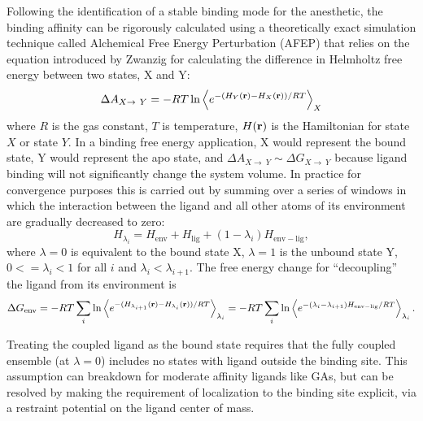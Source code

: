 \documentclass[12pt]{article}
\begin{document}
Following the identification of a stable binding mode for the anesthetic, the binding affinity can be rigorously calculated using a theoretically exact simulation technique called Alchemical Free Energy Perturbation (AFEP) that relies on the equation introduced by Zwanzig\cite{Zwanzig1954} for calculating the difference in Helmholtz free energy between two states, X and Y:
\begin{equation}
\Delta A_{X\rightarrow~Y} = -R T \ln \left \langle  e^{-({H_{Y}({\bf r})-H_{X}({\bf r})})/R T} \right \rangle_{X}
\end{equation}
where $R$ is the gas constant, $T$ is temperature, $H({\bf r})$ is the Hamiltonian for state $X$ or state $Y$. In a binding free energy application, X would represent the bound state, Y would represent the apo state, and $\Delta A_{X\rightarrow~Y} \sim \Delta G_{X\rightarrow~Y}$ because ligand binding will not significantly change the system volume. In practice \cite{Beveridge1989,Mark2002} for convergence purposes this is carried out by summing over a series of windows in which the interaction between the ligand and all other atoms of its environment are gradually decreased to zero: 
\begin{equation}
H_{\lambda_{i}} = H_{\mathrm{env}} + H_{\mathrm{lig}} + (1 - \lambda_{i}) H_{\mathrm{env-lig}} , 
\end{equation} 
where $\lambda = 0$ is equivalent to the bound state X, $\lambda = 1$ is the unbound state Y, $0<=\lambda_{i}<1$ for all $i$ and $\lambda_{i}<\lambda_{i+1}$. The free energy change for ``decoupling'' the ligand from its environment is 
\begin{equation}
\Delta G_{\mathrm{env}} = -R T \sum_{i}   \ln \left \langle  e^{-({H_{\lambda_{i+1}}({\bf r})-H_{\lambda_{i}}({\bf r})})/R T} \right \rangle_{\lambda_{i}} = -R T \sum_{i}   \ln \left \langle  e^{-( \lambda_{i} - \lambda_{i+1}) H_{\mathrm{env-lig}}/R T} \right \rangle_{\lambda_{i}} \label{eq:lambda}. 
\end{equation}

Treating the coupled ligand as the bound state requires that the fully coupled ensemble (at $\lambda=0$) includes no states with ligand outside the binding site. This assumption can breakdown for moderate affinity ligands like GAs, but can be resolved by making the requirement of localization to the binding site explicit, via a restraint potential on the ligand center of mass.  
\end{document}
